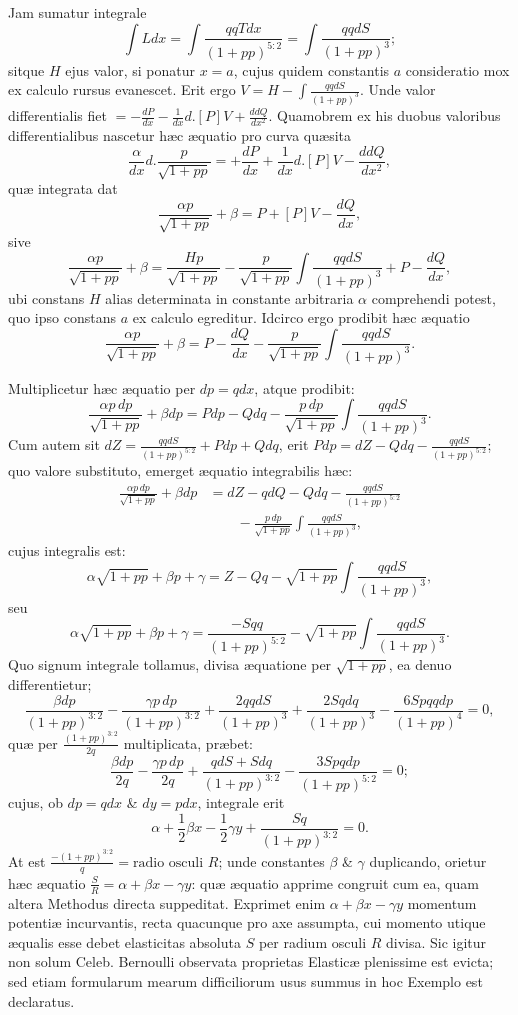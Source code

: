 Jam sumatur integrale
\[\int Ldx=\int\frac{qqTdx}{(1+pp)^{5:2}}=\int\frac{qqdS}{(1+pp)^3};\]
sitque $H$ ejus valor, si ponatur $x=a$, cujus quidem constantis $a$ consideratio mox ex calculo rursus evanescet. Erit ergo $V=H-\int\frac{qqdS}{(1+pp)^3}$. Unde valor differentialis fiet $=-\frac{dP}{dx}-\frac1{dx}d.[P]V+\frac{ddQ}{dx^2}$. Quamobrem ex his duobus valoribus differentialibus nascetur hæc æquatio pro curva quæsita
\[\frac\alpha{dx}d.\frac p{\sqrt{1+pp}}=+\frac{dP}{dx}+\frac1{dx}d.[P]V-\frac{ddQ}{dx^2},\]
quæ integrata dat
\[\frac{\alpha p}{\sqrt{1+pp}}+\beta=P+[P]V-\frac{dQ}{dx},\]
sive
\[\frac{\alpha p}{\sqrt{1+pp}}+\beta=\frac{Hp}{\sqrt{1+pp}}-\frac p{\sqrt{1+pp}}\int\frac{qqdS}{(1+pp)^3}+P-\frac{dQ}{dx},\]
ubi constans $H$ alias determinata in constante arbitraria $\alpha$ comprehendi potest, quo ipso constans $a$ ex calculo egreditur. Idcirco ergo prodibit hæc æquatio
\[\frac{\alpha p}{\sqrt{1+pp}}+\beta=P-\frac{dQ}{dx}-\frac p{\sqrt{1+pp}}\int\frac{qqdS}{(1+pp)^3}.\]

Multiplicetur hæc æquatio per $dp=qdx$, atque prodibit:
\[\frac{\alpha p\,dp}{\sqrt{1+pp}}+\beta dp=Pdp-Qdq-\frac{p\,dp}{\sqrt{1+pp}}\int\frac{qqdS}{(1+pp)^3}.\]
Cum autem sit $dZ=\frac{qqdS}{(1+pp)^{5:2}}+Pdp+Qdq$, erit $Pdp=dZ-Qdq-\frac{qqdS}{(1+pp)^{5:2}}$; quo valore substituto, emerget æquatio integrabilis hæc:
\[\begin{aligned}
\frac{\alpha p\,dp}{\sqrt{1+pp}}+\beta dp&=dZ-qdQ-Qdq-\frac{qqdS}{(1+pp)^{5:2}}\\
&\qquad-\frac{p\,dp}{\sqrt{1+pp}}\int\frac{qqdS}{(1+pp)^3},
\end{aligned}\]
cujus integralis est:
\[\alpha\sqrt{1+pp}+\beta p+\gamma=Z-Qq-\sqrt{1+pp}\int\frac{qqdS}{(1+pp)^3},\]
seu
\[\alpha\sqrt{1+pp}+\beta p+\gamma=\frac{-Sqq}{(1+pp)^{5:2}}-\sqrt{1+pp}\int\frac{qqdS}{(1+pp)^3}.\]
Quo signum integrale tollamus, divisa æquatione per $\sqrt{1+pp}$, ea denuo differentietur;
\[\frac{\beta dp}{(1+pp)^{3:2}}-\frac{\gamma p\,dp}{(1+pp)^{3:2}}+\frac{2qqdS}{(1+pp)^3}+\frac{2Sqdq}{(1+pp)^3}-\frac{6Spqqdp}{(1+pp)^4}=0,\]
quæ per $\frac{(1+pp)^{3:2}}{2q}$ multiplicata, præbet:
\[\frac{\beta dp}{2q}-\frac{\gamma p\,dp}{2q}+\frac{qdS+Sdq}{(1+pp)^{3:2}}-\frac{3Spqdp}{(1+pp)^{5:2}}=0;\]
cujus, ob $dp=qdx$ \& $dy=pdx$, integrale erit
\[\alpha+\frac12\beta x-\frac12\gamma y+\frac{Sq}{(1+pp)^{3:2}}=0.\]
At est $\frac{-(1+pp)^{3:2}}q=\text{radio osculi }R$; unde constantes $\beta$ \& $\gamma$ duplicando, orietur hæc æquatio $\frac SR=\alpha+\beta x-\gamma y$: quæ æquatio apprime congruit cum ea, quam altera Methodus directa suppeditat. Exprimet enim $\alpha+\beta x-\gamma y$ momentum potentiæ incurvantis, recta quacunque pro axe assumpta, cui momento utique æqualis esse debet elasticitas absoluta $S$ per radium osculi $R$ divisa. Sic igitur non solum Celeb. Bernoulli observata proprietas Elasticæ plenissime est evicta; sed etiam formularum mearum difficiliorum usus summus in hoc Exemplo est declaratus.

